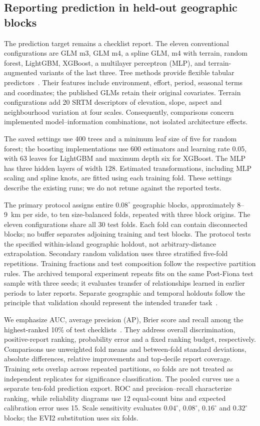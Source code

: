 \subsection{Reporting prediction in held-out geographic blocks}
\label{sec:protocols}
The prediction target remains a checklist report. The eleven conventional configurations are GLM m3, GLM m4, a spline GLM, m4 with terrain, random forest, LightGBM, XGBoost, a multilayer perceptron (MLP), and terrain-augmented variants of the last three. Tree methods provide flexible tabular predictors~\cite{breiman2001,ke2017,chen2016}. Their features include environment, effort, period, seasonal terms and coordinates; the published GLMs retain their original covariates. Terrain configurations add 20 SRTM descriptors of elevation, slope, aspect and neighbourhood variation at four scales. Consequently, comparisons concern implemented model--information combinations, not isolated architecture effects.

The saved settings use 400 trees and a minimum leaf size of five for random forest; the boosting implementations use 600 estimators and learning rate 0.05, with 63 leaves for LightGBM and maximum depth six for XGBoost. The MLP has three hidden layers of width 128. Estimated transformations, including MLP scaling and spline knots, are fitted using each training fold. These settings describe the existing runs; we do not retune against the reported tests.

The primary protocol assigns entire $0.08^\circ$ geographic blocks, approximately 8--9~km per side, to ten size-balanced folds, repeated with three block origins. The eleven configurations share all 30 test folds. Each fold can contain disconnected blocks; no buffer separates adjoining training and test blocks. The protocol tests the specified within-island geographic holdout, not arbitrary-distance extrapolation. Secondary random validation uses three stratified five-fold repetitions. Training fractions and test composition follow the respective partition rules. The archived temporal experiment repeats fits on the same Post-Fiona test sample with three seeds; it evaluates transfer of relationships learned in earlier periods to later reports. Separate geographic and temporal holdouts follow the principle that validation should represent the intended transfer task~\cite{spacetime2025}.

We emphasize AUC, average precision (AP), Brier score and recall among the highest-ranked 10\% of test checklists~\cite{saito2015,brier1950}. They address overall discrimination, positive-report ranking, probability error and a fixed ranking budget, respectively. Comparisons use unweighted fold means and between-fold standard deviations, absolute differences, relative improvements and top-decile report coverage. Training sets overlap across repeated partitions, so folds are not treated as independent replicates for significance classification. The pooled curves use a separate ten-fold prediction export. ROC and precision--recall characterize ranking, while reliability diagrams use 12 equal-count bins and expected calibration error uses 15. Scale sensitivity evaluates $0.04^\circ$, $0.08^\circ$, $0.16^\circ$ and $0.32^\circ$ blocks; the EVI2 substitution uses six folds.

